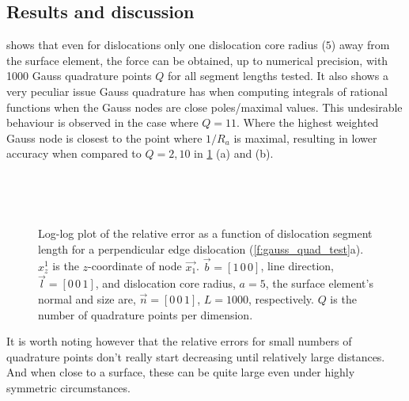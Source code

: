 \subsection{Results and discussion}\label{ss:paperResults}

 shows that even for dislocations only one dislocation core radius ($5$) away from the surface element, the force can be obtained, up to numerical precision, with 1000 Gauss quadrature points $Q$ for all segment lengths tested. It also shows a very peculiar issue Gauss quadrature has when computing integrals of rational functions when the Gauss nodes are close poles/maximal values. This undesirable behaviour is observed in the case where $Q = 11$. Where the highest weighted Gauss node is closest to the point where $1/R_{a}$ is maximal, resulting in lower accuracy when compared to $Q = 2, 10$ in \cref{f:rel_err_perp_edge} (a) and (b).
\begin{figure}
    \centering
    ~

    ~
    \caption[Relative error for an edge dislocation perpendicular to a surface element.]{Log-log plot of the relative error as a function of dislocation segment length for a perpendicular edge dislocation (\cref{f:gauss_quad_test}a). $x^{1}_{z}$ is the $z$-coordinate of node $\vec{x_1}$. $\vec{b} = [1\, 0\, 0]$, line direction, $\vec{l} = [0\, 0\, 1]$, and dislocation core radius, $a = 5$, the surface element's normal and size are, $\vec{n} = [0\, 0\, 1]$, $L = 1000$, respectively. $Q$ is the number of quadrature points per dimension.}
    \label{f:rel_err_perp_edge}
\end{figure}
It is worth noting however that the relative errors for small numbers of quadrature points don't really start decreasing until relatively large distances. And when close to a surface, these can be quite large even under highly symmetric circumstances.

